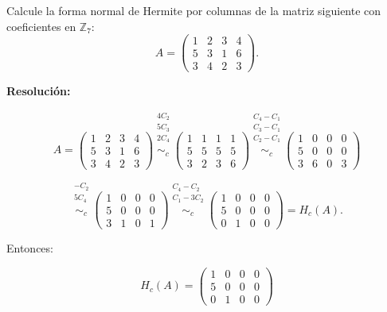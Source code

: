 \documentclass[a4paper,12pt]{article}
\begin{document}
\begin{ejercicio}[title=Ejercicio 12]
Calcule la forma normal de Hermite por columnas de la matriz siguiente con coeficientes en $\mathbb{Z}_7$:
\[
A =
\begin{pmatrix}
1 & 2 & 3 & 4\\
5 & 3 & 1 & 6\\
3 & 4 & 2 & 3
\end{pmatrix}.
\]

\tcblower
\textbf{Resolución:}

\[
A =
\begin{pmatrix}
1 & 2 & 3 & 4\\
5 & 3 & 1 & 6\\
3 & 4 & 2 & 3
\end{pmatrix}
\overset{\substack{4C_2 \\ 5C_3 \\ 2C_4 \\ {}}}{\sim_c}
\begin{pmatrix}
1 & 1 & 1 & 1\\
5 & 5 & 5 & 5\\
3 & 2 & 3 & 6
\end{pmatrix}
\overset{\substack{C_4 - C_1 \\ C_3 - C_1 \\ C_2 - C_1 \\ {}}}{\sim_c}
\begin{pmatrix}
1 & 0 & 0 & 0\\
5 & 0 & 0 & 0\\
3 & 6 & 0 & 3
\end{pmatrix}
\]

\[
\overset{\substack{-C_2 \\ 5C_4\\ {}}}{\sim_c}
\begin{pmatrix}
1 & 0 & 0 & 0\\
5 & 0 & 0 & 0\\
3 & 1 & 0 & 1
\end{pmatrix}
\overset{\substack{C_4 - C_2 \\ C_1 - 3C_2 \\ {}}}{\sim_c}
\begin{pmatrix}
1 & 0 & 0 & 0\\
5 & 0 & 0 & 0\\
0 & 1 & 0 & 0
\end{pmatrix}
= H_c(A).
\]

Entonces:

\[
\boxed{
H_c(A) =
\begin{pmatrix}
1 & 0 & 0 & 0\\
5 & 0 & 0 & 0\\
0 & 1 & 0 & 0
\end{pmatrix}
}
\]
\end{ejercicio}
\end{document}
